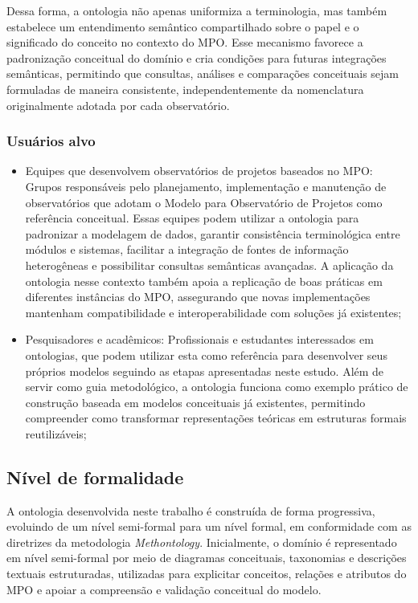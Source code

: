 Dessa forma, a ontologia não apenas uniformiza a terminologia, mas também estabelece um entendimento semântico compartilhado sobre o papel e o significado do conceito no contexto do MPO. Esse mecanismo favorece a padronização conceitual do domínio e cria condições para futuras integrações semânticas, permitindo que consultas, análises e comparações conceituais sejam formuladas de maneira consistente, independentemente da nomenclatura originalmente adotada por cada observatório.

\subsubsection{Usuários alvo}
\begin{itemize}
    \item Equipes que desenvolvem observatórios de projetos baseados no MPO\cite{vieira2022thesis}: Grupos responsáveis pelo planejamento, implementação e manutenção de observatórios que adotam o Modelo para Observatório de Projetos como referência conceitual. Essas equipes podem utilizar a ontologia para padronizar a modelagem de dados, garantir consistência terminológica entre módulos e sistemas, facilitar a integração de fontes de informação heterogêneas e possibilitar consultas semânticas avançadas. A aplicação da ontologia nesse contexto também apoia a replicação de boas práticas em diferentes instâncias do MPO\cite{vieira2022thesis}, assegurando que novas implementações mantenham compatibilidade e interoperabilidade com soluções já existentes;
    \item Pesquisadores e acadêmicos: Profissionais e estudantes interessados em ontologias, que podem utilizar esta como referência para desenvolver seus próprios modelos seguindo as etapas apresentadas neste estudo. Além de servir como guia metodológico, a ontologia funciona como exemplo prático de construção baseada em modelos conceituais já existentes, permitindo compreender como transformar representações teóricas em estruturas formais reutilizáveis;
\end{itemize}

\subsection{Nível de formalidade}
A ontologia desenvolvida neste trabalho é construída de forma progressiva, evoluindo de um nível semi-formal para um nível formal, em conformidade com as diretrizes da metodologia \textit{Methontology}. Inicialmente, o domínio é representado em nível semi-formal por meio de diagramas conceituais, taxonomias e descrições textuais estruturadas, utilizadas para explicitar conceitos, relações e atributos do MPO e apoiar a compreensão e validação conceitual do modelo.


